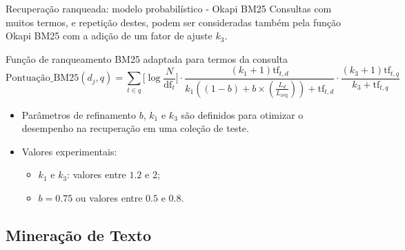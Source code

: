 \documentclass[%
  10pt,%
  aspectratio = 169,%
  compress,%
  t,%
]{beamer}%
\begin{document}
    \begin{frame}[fragile = singleslide]{}{Recuperação ranqueada: modelo probabilístico - Okapi BM25}
        Consultas com muitos termos, e repetição destes, podem ser consideradas também pela função Okapi BM25 com a adição de um fator de ajuste $k_3$.

        \begin{block}{Função de ranqueamento BM25 adaptada para termos da consulta}
            \begin{equation}
                \label{eq:okapi-bm25-tf-consulta}
        		\text{Pontuação\_BM25}(d_j, q) =
        		\sum_{t \in q}
        		\Bigg[ \log{\frac{N}{\text{df}_{t}}} \Bigg]
        		\cdot
        		\frac{(k_1 + 1) \text{tf}_{t,d}}{k_1((1-b)+b \times (\frac{L_d}{L_{\text{avg}}})) + \text{tf}_{t,d}} \cdot
        		\frac{(k_3+1) \text{tf}_{t,q}}{k_3 + \text{tf}_{t,q}}
            \end{equation}
        \end{block}
        \begin{itemize}
            \item Parâmetros de refinamento $b$, $k_1$ e $k_3$ são definidos para otimizar o desempenho na recuperação em uma coleção de teste.
            \item Valores experimentais:
                \begin{itemize}
                    \item $k_1$ e $k_3$: valores entre $1.2$ e $2$;
                    \item $b = 0.75$ ou valores entre $0.5$ e $0.8$.
                \end{itemize}
        \end{itemize}
    \end{frame}

    \subsection{Mineração de Texto}\label{subsec:MT}
\end{document}
